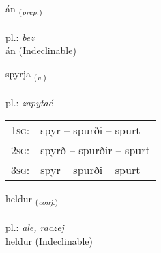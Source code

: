 \documentclass[frontgrid, backgrid]{flacards}\usepackage[]{graphicx}\usepackage[]{xcolor}
\begin{document}
{án \small{\textsubscript{(\textit{prep.})}} \\[1ex]
\textphonetic{[auːn]} \\
pl.: \emph{bez} \\  [2ex]
án (Indeclinable)}

\renewcommand{\flhead}{\vskip5pt \fboxsep=0pt {\small\bfseries\footnotesize Sagnorð | Verb}}
\renewcommand{\fcfoot}{\vskip5pt \fboxsep=0pt \hspace{2pt}{\small\bfseries\footnotesize 1K}}

\renewcommand{\blhead}{\vskip5pt {\small\bfseries\footnotesize Sagnorð | Verb }}
\renewcommand{\bcfoot}{\vskip5pt \hspace{2pt}{\small\bfseries\footnotesize 1K}}


{spyrja \small{\textsubscript{(\textit{v.})}} \\[1ex] %
\textphonetic{[spɪrja]} \\
pl.: \emph{zapytać} \\  [2ex]
\renewcommand*{\arraystretch}{0.8}
\begin{tabular}{p{1cm}l}
\textsc{1sg}: & spyr -- spurði -- spurt \\ 
\textsc{2sg}: & spyrð -- spurðir -- spurt \\ 
\textsc{3sg}: & spyr -- spurði -- spurt \\ 
\end{tabular}
}


\renewcommand{\flhead}{\vskip5pt \fboxsep=0pt {\small\bfseries\footnotesize Samtenging | Conjuction}}
\renewcommand{\fcfoot}{\vskip5pt \fboxsep=0pt \hspace{2pt}{\small\bfseries\footnotesize 1K}}

\renewcommand{\blhead}{\vskip5pt {\small\bfseries\footnotesize Samtenging | Conjuction }}
\renewcommand{\bcfoot}{\vskip5pt \hspace{2pt}{\small\bfseries\footnotesize 1K}}


{heldur \small{\textsubscript{(\textit{conj.})}} \\[1ex]
\textphonetic{[hɛltʏr]} \\
pl.: \emph{ale, raczej} \\  [2ex]
heldur (Indeclinable)}
\end{document}
